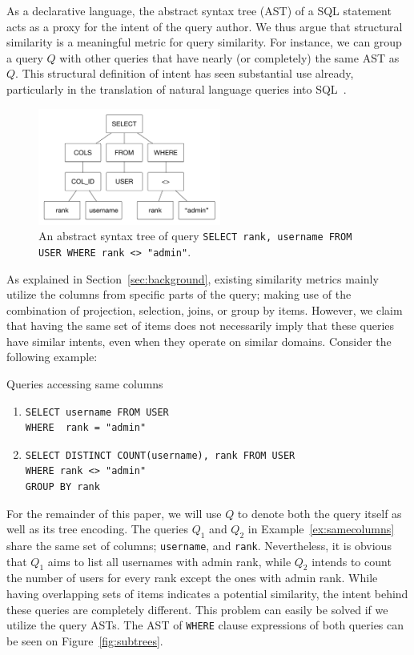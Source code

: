
As a declarative language, the abstract syntax tree (AST) of a SQL statement acts as a proxy for the intent of the query author. We thus argue that structural similarity is a meaningful metric for query similarity.
For instance, we can group a query $Q$ with other queries that have nearly (or completely) the same AST as $Q$.
This structural definition of intent has seen substantial use already, particularly in the translation of natural language queries into SQL~\cite{li2015NLPI}.  

\begin{figure}[h!]
\centering
\includegraphics[width=6cm]{graphics/ast2}
\caption{An abstract syntax tree of query \texttt{SELECT rank, username FROM USER WHERE  rank <> "admin"}.}
\label{fig:exampleAST}
\end{figure}

As explained in Section~\ref{sec:background}, existing similarity metrics mainly utilize the columns from specific parts of the query; making use of the combination of projection, selection, joins, or group by items. However, we claim that having the same set of items does not necessarily imply that these queries have similar intents, even when they operate on similar domains. Consider the following example:

\begin{example} Queries accessing same columns
\label{ex:samecolumns}
\begin{enumerate}
\item\begin{verbatim}SELECT username FROM USER
WHERE  rank = "admin"\end{verbatim}
\item\begin{verbatim}SELECT DISTINCT COUNT(username), rank FROM USER
WHERE rank <> "admin"
GROUP BY rank
\end{verbatim}
\end{enumerate}
\end{example}

For the remainder of this paper, we will use $Q$ to denote both the query itself as well as its tree encoding.
The queries $Q_1$ and $Q_2$ in Example~\ref{ex:samecolumns} share the same set of columns; \texttt{username}, and \texttt{rank}. Nevertheless, it is obvious that $Q_1$ aims to list all usernames with admin rank, while $Q_2$ intends to count the number of users for every rank except the ones with admin rank. While having overlapping sets of items indicates a potential similarity, the intent behind these queries are completely different. This problem can easily be solved if we utilize the query ASTs. The AST of \texttt{WHERE} clause expressions of both queries can be seen on Figure~\ref{fig:subtrees}.


